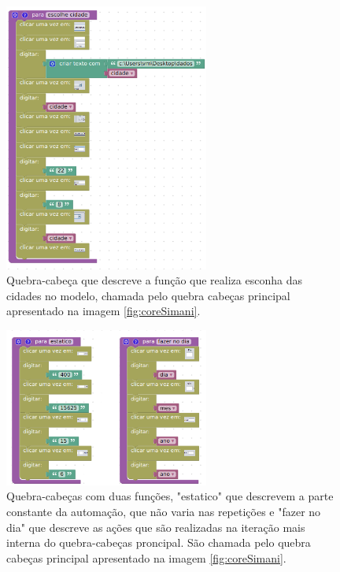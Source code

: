 \documentclass[tg]{mdtufsm}
\begin{document}
                    \begin{figure}[!htb]
                        {\centering
                        \includegraphics[width=0.6\textwidth]{imagens/EscolheCidade.png}
                        \caption{Quebra-cabeça que descreve a função que realiza esconha das cidades no modelo, chamada pelo quebra cabeças principal apresentado na imagem \ref{fig:coreSimani}.}
                        \label{fig:EscolheCidade}}
                    \end{figure}

                    \begin{figure}[!htb]
                        {\centering
                        \includegraphics[width=0.6\textwidth]{imagens/estaticoDia.png}
                        \caption{Quebra-cabeças com duas funções, "estatico" que descrevem a parte constante da automação, que não varia nas repetições e "fazer no dia" que descreve as ações que são realizadas na iteração mais interna do quebra-cabeças proncipal. São chamada pelo quebra cabeças principal apresentado na imagem \ref{fig:coreSimani}.}
                        \label{fig:estaticoDia}}
                    \end{figure}
\end{document}

